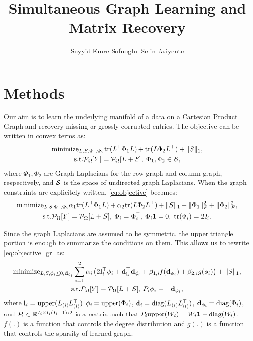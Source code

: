 \documentclass{article}
\title{Simultaneous Graph Learning and Matrix Recovery}
\author{Seyyid Emre Sofuoglu, Selin Aviyente}
\begin{document}
\maketitle

\section{Methods}
Our aim is to learn the underlying manifold of a data on a Cartesian Product Graph and recovery missing or grossly corrupted entries. The objective can be written in convex terms as:
\begin{gather}
    \text{minimize}_{L, S, \Phi_1, \Phi_2}\mathrm{tr}(L^\top \Phi_1 L) + \mathrm{tr}(L \Phi_2 L^\top) + \|S\|_1, \nonumber \\ \text{s.t.} \P_{\Omega}[Y] = \P_{\Omega}[L + S], \; \Phi_1, \Phi_2 \in \S, 
    \label{eq:objective}
\end{gather}
where $\Phi_1, \Phi_2$ are Graph Laplacians for the row graph and column graph, respectively, and $\S$ is the space of undirected graph Laplacians. When the graph constraints are explicitely written, \eqref{eq:objective} becomes:
\begin{gather}
    \text{minimize}_{L, S, \Phi_1, \Phi_2}\alpha_1\mathrm{tr}(L^\top \Phi_1 L) + \alpha_2\mathrm{tr}(L \Phi_2 L^\top) + \|S\|_1 + \|\Phi_1\|_F^2+ \|\Phi_2\|_F^2, \nonumber\\ \text{s.t.} \P_{\Omega}[Y] = \P_{\Omega}[L + S], \; \Phi_i=\Phi_i^\top, \; \Phi_i\mathbf{1} = 0, \; \mathrm{tr}(\Phi_i)=2I_i.
    \label{eq:objective_gr}
\end{gather}

Since the graph Laplacians are assumed to be symmetric, the upper triangle portion is enough to summarize the conditions on them. This allows us to rewrite \eqref{eq:objective_gr} as:
\begin{gather}
    \text{minimize}_{L, S, \phi_i\leq 0, \d_{\phi_i}} \sum_{i=1}^2\alpha_i\left(2\l_i^\top \phi_i + \d_{\l_i}^\top \d_{\phi_i}+\beta_{1,i}f(\d_{\phi_i})+\beta_{2,i} g(\phi_i) \right) + \|S\|_1, \nonumber\\ \text{s.t.} \P_{\Omega}[Y] = \P_{\Omega}[L + S], \; P_i \phi_i = -\d_{\phi_i},
\end{gather}
where $\l_i=\upper(L_{(i)} L_{(i)}^\top)$ $\phi_i=\upper(\Phi_i)$, $\d_i=\diag(L_{(i)} L_{(i)}^\top)$, $\d_{\phi_i} = \diag(\Phi_i)$, and $P_i\in\R^{I_i\times I_i(I_i-1)/2}$ is a matrix such that $P_i \upper(W_i) = W_i\mathbf{1}-\diag(W_i)$. $f(.)$ is a function that controls the degree distribution and $g(.)$ is a function that controls the sparsity of learned graph.
\end{document}
